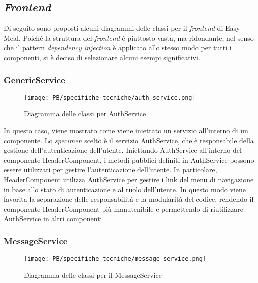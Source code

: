 \subsection{\textit{Frontend}}

Di seguito sono proposti alcuni diagrammi delle classi per il \textit{frontend}
di Easy-Meal. Poiché la struttura del \textit{frontend} è piuttosto vasta, ma
ridondante, nel senso che il pattern \textit{dependency injection} è applicato
allo stesso modo per tutti i componenti, si è deciso di selezionare alcuni
esempi significativi.

\subsubsection{GenericService}

\begin{figure}[H]
	\centering
	\texttt{[image: PB/specifiche-tecniche/auth-service.png]}
	\caption{Diagramma delle classi per AuthService}
\end{figure}

In questo caso, viene mostrato come viene iniettato un servizio all'interno di
un componente. Lo \textit{specimen} scelto è il servizio AuthService,
che è responsabile della gestione dell'autenticazione dell'utente. Iniettando
AuthService all'interno del componente HeaderComponent, i metodi pubblici
definiti in AuthService possono essere utilizzati per gestire l'autenticazione
dell'utente. In particolare, HeaderComponent utilizza AuthService per gestire i
link del menu di navigazione in base allo stato di autenticazione e al ruolo 
dell'utente. In questo modo viene favorita la separazione delle responsabilità
e la modularità del codice, rendendo il componente HeaderComponent più
manutenibile e permettendo di riutilizzare AuthService in altri componenti.

\subsubsection{MessageService}

\begin{figure}[H]
	\centering
	\texttt{[image: PB/specifiche-tecniche/message-service.png]}
	\caption{Diagramma delle classi per il MessageService}
\end{figure}

